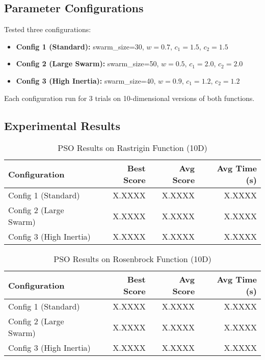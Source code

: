 \documentclass[letterpaper]{article}
\begin{document}
\subsection{Parameter Configurations}

Tested three configurations:
\begin{itemize}
\item \textbf{Config 1 (Standard):} swarm\_size=30, $w=0.7$, $c_1=1.5$, $c_2=1.5$
\item \textbf{Config 2 (Large Swarm):} swarm\_size=50, $w=0.5$, $c_1=2.0$, $c_2=2.0$
\item \textbf{Config 3 (High Inertia):} swarm\_size=40, $w=0.9$, $c_1=1.2$, $c_2=1.2$
\end{itemize}

Each configuration run for 3 trials on 10-dimensional versions of both functions.

\subsection{Experimental Results}


\begin{table}[h]
\centering
\caption{PSO Results on Rastrigin Function (10D)}
\label{tab:pso-rastrigin}
\begin{tabular}{@{}lrrr@{}}
\toprule
Configuration & Best Score & Avg Score & Avg Time (s) \\
\midrule
Config 1 (Standard) & X.XXXX & X.XXXX & X.XXXX \\
Config 2 (Large Swarm) & X.XXXX & X.XXXX & X.XXXX \\
Config 3 (High Inertia) & X.XXXX & X.XXXX & X.XXXX \\
\bottomrule
\end{tabular}
\end{table}

\begin{table}[h]
\centering
\caption{PSO Results on Rosenbrock Function (10D)}
\label{tab:pso-rosenbrock}
\begin{tabular}{@{}lrrr@{}}
\toprule
Configuration & Best Score & Avg Score & Avg Time (s) \\
\midrule
Config 1 (Standard) & X.XXXX & X.XXXX & X.XXXX \\
Config 2 (Large Swarm) & X.XXXX & X.XXXX & X.XXXX \\
Config 3 (High Inertia) & X.XXXX & X.XXXX & X.XXXX \\
\bottomrule
\end{tabular}
\end{table}
\end{document}
